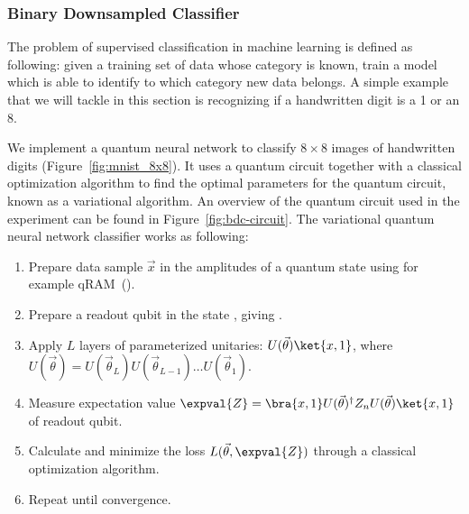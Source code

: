 \documentclass[a4paper,10pt]{article}
\begin{document}
\subsubsection{Binary Downsampled Classifier}
The problem of supervised classification in machine learning is defined as following: given a training set of data whose category is known, train a model which is able to identify to which category new data belongs.
A simple example that we will tackle in this section is recognizing if a handwritten digit is a 1 or an 8.

We implement a quantum neural network to classify $8 \times 8$ images of handwritten digits (Figure~\ref{fig:mnist_8x8}).
It uses a quantum circuit together with a classical optimization algorithm to find the optimal parameters for the quantum circuit, known as a variational algorithm.
An overview of the quantum circuit used in the experiment can be found in Figure~\ref{fig:bdc-circuit}.
The variational quantum neural network classifier works as following:
\begin{enumerate}
	\item Prepare data sample $\vec{x}$ in the amplitudes of a quantum state  using for example qRAM~(\cite{qram}).
	\item Prepare a readout qubit in the state , giving .
	\item Apply $L$ layers of parameterized unitaries: $U(\vec{\theta})\ket{x, 1}$, where $U(\vec{\theta}) = U(\vec{\theta}_L) U(\vec{\theta}_{L-1}) \ldots U(\vec{\theta}_1)$.
	\item Measure expectation value $\expval{Z} = \bra{x, 1}U(\vec{\theta})^\dagger Z_n U(\vec{\theta})\ket{x, 1}$ of readout qubit.
	\item Calculate and minimize the loss $L(\vec{\theta}, \expval{Z})$ through a classical optimization algorithm.
	\item Repeat until convergence.
\end{enumerate}
\end{document}
